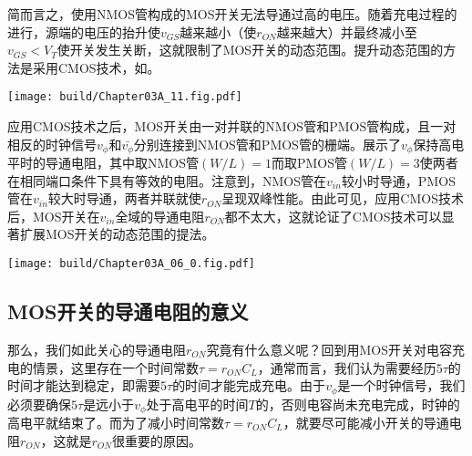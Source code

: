 简而言之，使用NMOS管构成的MOS开关无法导通过高的电压。随着充电过程的进行，源端的电压的抬升使$v_{GS}$越来越小（使$r_{ON}$越来越大）并最终减小至$v_{GS}<V_T$使开关发生关断，这就限制了MOS开关的动态范围。提升动态范围的方法是采用CMOS技术，如。

\begin{Figure}[MOS开关采用CMOS技术的改进]
    \texttt{[image: build/Chapter03A\_11.fig.pdf]}
\end{Figure}

应用CMOS技术之后，MOS开关由一对并联的NMOS管和PMOS管构成，且一对相反的时钟信号$v_{\phi}$和$\bar{v_{\phi}}$分别连接到NMOS管和PMOS管的栅端。展示了$v_{\phi}$保持高电平时的导通电阻，其中取NMOS管$(W/L)=1$而取PMOS管$(W/L)=3$使两者在相同端口条件下具有等效的电阻。注意到，NMOS管在$v_{in}$较小时导通，PMOS管在$v_{in}$较大时导通，两者并联就使$r_{ON}$呈现双峰性能。由此可见，应用CMOS技术后，MOS开关在$v_{in}$全域的导通电阻$r_{ON}$都不太大，这就论证了CMOS技术可以显著扩展MOS开关的动态范围的提法。
\begin{Figure}[MOS开关采用CMOS技术后的导通电阻]
    \begin{FigureSub}
        \texttt{[image: build/Chapter03A\_06\_0.fig.pdf]}
    \end{FigureSub}
\end{Figure}

\subsection{MOS开关的导通电阻的意义}
那么，我们如此关心的导通电阻$r_{ON}$究竟有什么意义呢？回到用MOS开关对电容充电的情景，这里存在一个时间常数$\tau=r_{ON} C_L$，通常而言，我们认为需要经历$5\tau$的时间才能达到稳定，即需要$5\tau$的时间才能完成充电。由于$v_{\phi}$是一个时钟信号，我们必须要确保$5\tau$是远小于$v_{\phi}$处于高电平的时间$T$的，否则电容尚未充电完成，时钟的高电平就结束了。而为了减小时间常数$\tau=r_{ON} C_L$，就要尽可能减小开关的导通电阻$r_{ON}$，这就是$r_{ON}$很重要的原因。


